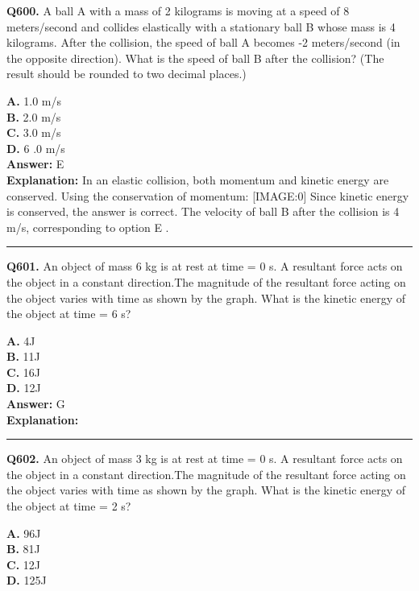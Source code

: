 \documentclass[12pt]{article}
\begin{document}
\noindent
\textbf{Q600.} A ball A with a mass of 2 kilograms is moving at a speed of 8 meters/second and collides elastically with a stationary ball B whose mass is 4 kilograms. After the collision, the speed of ball A becomes -2 meters/second (in the opposite direction). What is the speed of ball B after the collision? (The result should be rounded to two decimal places.)



\textbf{A.} 1.0 m/s \\
\textbf{B.} 2.0 m/s \\
\textbf{C.} 3.0 m/s \\
\textbf{D.} 6
.0 m/s \\

\textbf{Answer:} E \\
\textbf{Explanation:} In an elastic collision, both momentum and kinetic energy are conserved. Using the conservation of momentum:
[IMAGE:0]
Since kinetic energy is conserved, the answer is correct. The velocity of ball B after the collision is 4 m/s, corresponding to option
E
.

\hrule
\vspace{1em}


\noindent
\textbf{Q601.} An object of mass
6
kg is at rest at time = 0 s. A resultant force acts on the object in a constant direction.The magnitude of the resultant force acting on the object varies with time as shown by the graph.
What is the kinetic energy of the object at time =
6
s?



\textbf{A.} 4J \\
\textbf{B.} 11J \\
\textbf{C.} 16J \\
\textbf{D.} 12J \\

\textbf{Answer:} G \\
\textbf{Explanation:} 

\hrule
\vspace{1em}


\noindent
\textbf{Q602.} An object of mass
3
kg is at rest at time = 0 s. A resultant force acts on the object in a constant direction.The magnitude of the resultant force acting on the object varies with time as shown by the graph.
What is the kinetic energy of the object at time =
2
s?



\textbf{A.} 96J \\
\textbf{B.} 81J \\
\textbf{C.} 12J \\
\textbf{D.} 125J \\
\end{document}
